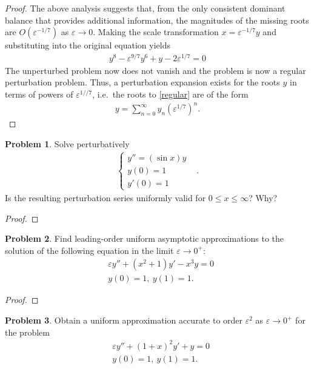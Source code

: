 \documentclass[12pt]{article}
\theoremstyle{definition}
\newtheorem{problem}{Problem}
\begin{document}
\begin{proof}
  The above analysis suggests that, from the only consistent dominant balance that
  provides additional information, the magnitudes of the missing roots are
  $O(\varepsilon^{-1/7})$ as $\varepsilon \to 0$. Making the scale transformation
  $x = \varepsilon^{-1/7}y$ and substituting into the original equation yields
  \begin{align}\label{regular}
    y^8 - \varepsilon^{9/7}y^6 + y - 2\varepsilon^{1/7} = 0
  \end{align}
  The unperturbed problem now does not vanish and the problem is now a regular perturbation problem.
  Thus, a perturbation expansion exists for the roots $y$ in terms of powers of $\varepsilon^{1//7}$, i.e.\
  the roots to \eqref{regular} are of the form
  \begin{align*}
    y = \sum_{n=0}^\infty y_n \left(\varepsilon^{1/7}\right)^n.
  \end{align*}
\end{proof}
\newpage


\begin{problem}
  Solve perturbatively
  \begin{align*}
    \begin{cases}
      y'' = (\sin x)y &\\
      y(0) = 1 &\\
      y'(0) = 1
    \end{cases}.
  \end{align*}
  Is the resulting perturbation series uniformly valid for $0\leq x \leq \infty$? Why?
\end{problem}

\begin{proof}
\end{proof}
\newpage


\begin{problem}
  Find leading-order uniform asymptotic approximations to the solution of the
  following equation in the limit $\varepsilon \to 0^+$:
  \begin{align*}
    &\varepsilon y'' + (x^2 + 1)y' - x^3y=0 \\
    &y(0) = 1,\ y(1) = 1.
  \end{align*}
\end{problem}

\begin{proof}
\end{proof}
\newpage


\begin{problem}
  Obtain a uniform approximation accurate to order $\varepsilon ^2$ as $\varepsilon \to 0^+$
  for the problem
  \begin{align*}
      &\varepsilon y'' + (1+x)^2 y' + y = 0 \\
      &y(0) = 1,\ y(1) = 1.
  \end{align*}
\end{problem}
\end{document}
